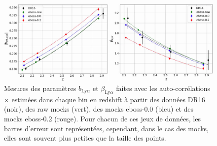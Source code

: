 \begin{figure}
  \centering
  \includegraphics[scale=0.43]{bias_cf}
  \caption{Mesures des paramètres $b_{\mathrm{Ly}\alpha}$ et $\beta_{\mathrm{Ly}\alpha}$ faites avec les auto-corrélations \lya{}$\times$\lya{} estimées dans chaque bin en redshift à partir des données DR16 (noir), des raw mocks (vert), des mocks eboss-0.0 (bleu) et des mocks eboss-0.2 (rouge). Pour chacun de ces jeux de données, les barres d'erreur sont représentées, cependant, dans le cas des mocks, elles sont souvent plus petites que la taille des points.}
  \label{fig:bias_cf}
\end{figure}


